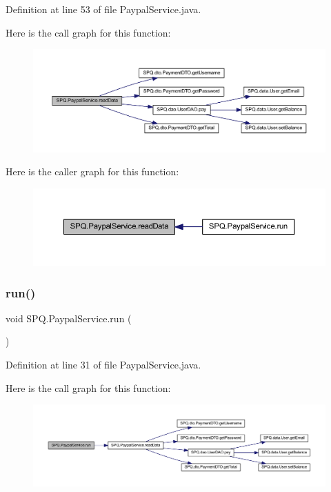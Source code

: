 Definition at line 53 of file Paypal\+Service.\+java.

Here is the call graph for this function\+:\nopagebreak
\begin{figure}[H]
\begin{center}
\leavevmode
\includegraphics[width=350pt]{class_s_p_q_1_1_paypal_service_aae478af6069bf1ffa928b09f2a91328d_cgraph}
\end{center}
\end{figure}
Here is the caller graph for this function\+:\nopagebreak
\begin{figure}[H]
\begin{center}
\leavevmode
\includegraphics[width=350pt]{class_s_p_q_1_1_paypal_service_aae478af6069bf1ffa928b09f2a91328d_icgraph}
\end{center}
\end{figure}
\mbox{\label{class_s_p_q_1_1_paypal_service_a05e65efee1bcfa26a215ea48b7c8696a}} 
\subsubsection{\texorpdfstring{run()}{run()}}
{\footnotesize\ttfamily void S\+P\+Q.\+Paypal\+Service.\+run (\begin{DoxyParamCaption}{ }\end{DoxyParamCaption})}



Definition at line 31 of file Paypal\+Service.\+java.

Here is the call graph for this function\+:\nopagebreak
\begin{figure}[H]
\begin{center}
\leavevmode
\includegraphics[width=350pt]{class_s_p_q_1_1_paypal_service_a05e65efee1bcfa26a215ea48b7c8696a_cgraph}
\end{center}
\end{figure}


